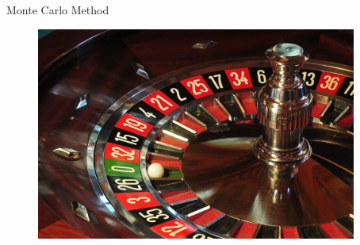 \documentclass[compress,red,12pt]{beamer}
\begin{document}

\begin{frame}{Monte Carlo Method}
  \begin{figure}
    \centering
    \begin{overprint}
      {\centerline{\includegraphics[height=7cm]{images/roullete.jpg}}} %
      {\centerline{\def\svgwidth{0.9\linewidth}\small{}}}
      {\centerline{\def\svgwidth{0.9\linewidth}\small{}}}
      {\centerline{\def\svgwidth{0.9\linewidth}\small{}}}
      {\centerline{\def\svgwidth{0.9\linewidth}\small{}}}
      {\centerline{\def\svgwidth{0.9\linewidth}\small{}}}
      {\centerline{\def\svgwidth{0.9\linewidth}\small{}}}
      {\centerline{\def\svgwidth{0.9\linewidth}\small{}}}
      {\centerline{\def\svgwidth{0.9\linewidth}\small{}}}
      {\centerline{\def\svgwidth{0.9\linewidth}\small{}}}
    \end{overprint}
  \end{figure}
\end{frame}

\end{document}
